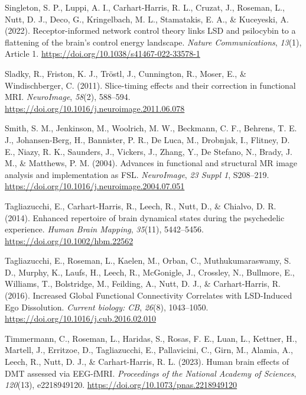 \begin{CSLReferences}{1}{0}
Singleton, S. P., Luppi, A. I., Carhart-Harris, R. L., Cruzat, J.,
Roseman, L., Nutt, D. J., Deco, G., Kringelbach, M. L., Stamatakis, E.
A., \& Kuceyeski, A. (2022). Receptor-informed network control theory
links LSD and psilocybin to a flattening of the brain's control energy
landscape. \emph{Nature Communications}, \emph{13}(1), Article 1.
\url{https://doi.org/10.1038/s41467-022-33578-1}

Sladky, R., Friston, K. J., Tröstl, J., Cunnington, R., Moser, E., \&
Windischberger, C. (2011). Slice-timing effects and their correction in
functional MRI. \emph{NeuroImage}, \emph{58}(2), 588--594.
\url{https://doi.org/10.1016/j.neuroimage.2011.06.078}

Smith, S. M., Jenkinson, M., Woolrich, M. W., Beckmann, C. F., Behrens,
T. E. J., Johansen-Berg, H., Bannister, P. R., De Luca, M., Drobnjak,
I., Flitney, D. E., Niazy, R. K., Saunders, J., Vickers, J., Zhang, Y.,
De Stefano, N., Brady, J. M., \& Matthews, P. M. (2004). Advances in
functional and structural MR image analysis and implementation as FSL.
\emph{NeuroImage}, \emph{23 Suppl 1}, S208--219.
\url{https://doi.org/10.1016/j.neuroimage.2004.07.051}

Tagliazucchi, E., Carhart-Harris, R., Leech, R., Nutt, D., \& Chialvo,
D. R. (2014). Enhanced repertoire of brain dynamical states during the
psychedelic experience. \emph{Human Brain Mapping}, \emph{35}(11),
5442--5456. \url{https://doi.org/10.1002/hbm.22562}

Tagliazucchi, E., Roseman, L., Kaelen, M., Orban, C., Muthukumaraswamy,
S. D., Murphy, K., Laufs, H., Leech, R., McGonigle, J., Crossley, N.,
Bullmore, E., Williams, T., Bolstridge, M., Feilding, A., Nutt, D. J.,
\& Carhart-Harris, R. (2016). Increased Global Functional Connectivity
Correlates with LSD-Induced Ego Dissolution. \emph{Current biology: CB},
\emph{26}(8), 1043--1050.
\url{https://doi.org/10.1016/j.cub.2016.02.010}

Timmermann, C., Roseman, L., Haridas, S., Rosas, F. E., Luan, L.,
Kettner, H., Martell, J., Erritzoe, D., Tagliazucchi, E., Pallavicini,
C., Girn, M., Alamia, A., Leech, R., Nutt, D. J., \& Carhart-Harris, R.
L. (2023). Human brain effects of DMT assessed via EEG-fMRI.
\emph{Proceedings of the National Academy of Sciences}, \emph{120}(13),
e2218949120. \url{https://doi.org/10.1073/pnas.2218949120}


\end{CSLReferences}
